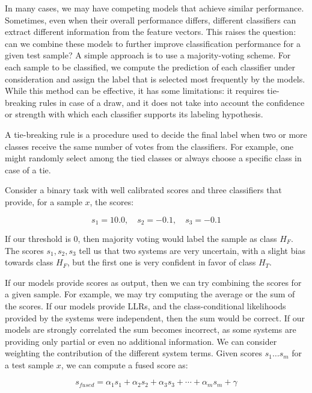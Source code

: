 In many cases, we may have competing models that achieve similar performance. Sometimes, even when their overall performance differs, different classifiers can extract different information from the feature vectors. This raises the question: can we combine these models to further improve classification performance for a given test sample? A simple approach is to use a majority-voting scheme. For each sample to be classified, we compute the prediction of each classifier under consideration and assign the label that is selected most frequently by the models. While this method can be effective, it has some limitations: it requires tie-breaking rules in case of a draw, and it does not take into account the confidence or strength with which each classifier supports its labeling hypothesis.

A tie-breaking rule is a procedure used to decide the final label when two or more classes receive the same number of votes from the classifiers. For example, one might randomly select among the tied classes or always choose a specific class in case of a tie.

Consider a binary task with well calibrated scores and three classifiers that provide, for a sample $x$, the scores:

\begin{equation*}
s_1 = 10.0,\quad s_2 = -0.1,\quad s_3 = -0.1
\end{equation*}

If our threshold is 0, then majority voting would label the sample as class $H_F$. The scores $s_1, s_2, s_3$ tell us that two systems are very uncertain, with a slight bias towards class $H_F$, but the first one is very confident in favor of class $H_T$.

If our models provide scores as output, then we can try combining the scores for a given sample. For example, we may try computing the average or the sum of the scores. If our models provide LLRs, and the class-conditional likelihoods provided by the systems were independent, then the sum would be correct. If our models are strongly correlated the sum becomes incorrect, as some systems are providing only partial or even no additional information. We can consider weighting the contribution of the different system terms. Given scores $s_1 \ldots s_m$ for a test sample $x$, we can compute a fused score as:

\begin{equation*}
s_{fused} = \alpha_1 s_1 + \alpha_2 s_2 + \alpha_3 s_3 + \cdots + \alpha_m s_m + \gamma
\end{equation*}


